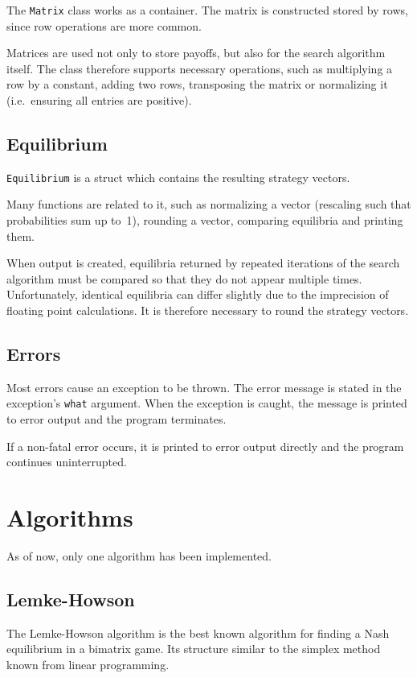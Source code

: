 \documentclass[a4paper,11pt]{article}
\begin{document}
The \verb|Matrix| class works as a container. The matrix is constructed stored by rows, since row operations are more common.

Matrices are used not only to store payoffs, but also for the search algorithm itself. The class therefore supports necessary operations, such as multiplying a row by a constant, adding two rows, transposing the matrix or normalizing it (i.e.\ ensuring all entries are positive).

\subsection{Equilibrium}

\verb|Equilibrium| is a struct which contains the resulting strategy vectors.

Many functions are related to it, such as normalizing a vector (rescaling such that probabilities sum up to~1), rounding a vector, comparing equilibria and printing them.

When output is created, equilibria returned by repeated iterations of the search algorithm must be compared so that they do not appear multiple times. Unfortunately, identical equilibria can differ slightly due to the imprecision of floating point calculations. It is therefore necessary to round the strategy vectors.

\subsection{Errors}

Most errors cause an exception to be thrown. The error message is stated in the exception's \verb|what| argument. When the exception is caught, the message is printed to error output and the program terminates.

If a non-fatal error occurs, it is printed to error output directly and the program continues uninterrupted.

\section{Algorithms}

As of now, only one algorithm has been implemented.

\subsection{Lemke-Howson}

The Lemke-Howson algorithm is the best known algorithm for finding a Nash equilibrium in a bimatrix game. Its structure similar to the simplex method known from linear programming.
\end{document}
